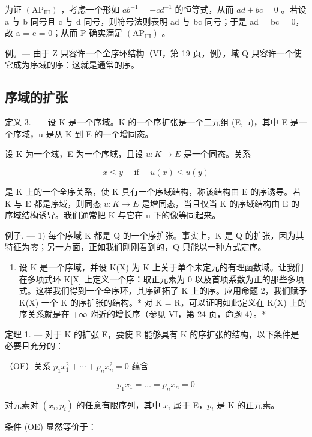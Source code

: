 为证 \((\mathrm{AP}_{\mathrm{III}})\) ，考虑一个形如 \(ab^{-1} = -cd^{-1}\) 的恒等式，从而 \(ad + bc = 0\) 。若设 a 与 b 同号且 c 与 d 同号，则符号法则表明 ad 与 bc 同号；于是 ad = bc = 0，故 a = c = 0；从而 P 确实满足 \((\mathrm{AP}_{\mathrm{III}})\) 。

例。--- 由于 Z 只容许一个全序环结构（VI，第 19 页，例），域 Q 只容许一个使它成为序域的序：这就是通常的序。

\subsection{序域的扩张}

定义 3.——设 K 是一个序域。K 的一个序扩张是一个二元组 (E, u)，其中 E 是一个序域，u 是从 K 到 E 的一个增同态。

设 K 为一个域，E 为一个序域，且设 \(u: K \rightarrow E\) 是一个同态。关系

\[
x \leqslant y \quad \text { if } \quad u (x) \leqslant u (y)
\]

是 K 上的一个全序关系，使 K 具有一个序域结构，称该结构由 E 的序诱导。若 K 与 E 都是序域，则同态 \(u: K \rightarrow E\) 是增同态，当且仅当 K 的序域结构由 E 的序域结构诱导。我们通常把 K 与它在 u 下的像等同起来。

例子. --- 1) 每个序域 K 都是 Q 的一个序扩张。事实上，K 是 Q 的扩张，因为其特征为零；另一方面，正如我们刚刚看到的，Q 只能以一种方式定序。

\begin{enumerate}
\def\labelenumi{\arabic{enumi})}
\setcounter{enumi}{1}
\tightlist
\item
  设 K 是一个序域，并设 K(X) 为 K 上关于单个未定元的有理函数域。让我们在多项式环 K{[}X{]} 上定义一个序：取正元素为 0 以及首项系数为正的那些多项式。这样我们得到一个全序环，其序延拓了 K 上的序。应用命题 2，我们赋予 K(X) 一个 K 的序扩张的结构。* 对 K = R，可以证明如此定义在 K(X) 上的序关系就是在 +∞ 附近的增长序（参见 VI，第 24 页，命题 4）。*
\end{enumerate}

定理 1. --- 对于 K 的扩张 E，要使 E 能够具有 K 的序扩张的结构，以下条件是必要且充分的：

（OE）关系 \(p_{1}x_{1}^{2} + \cdots + p_{n}x_{n}^{2} = 0\) 蕴含

\[
p _ {1} x _ {1} = \dots = p _ {n} x _ {n} = 0
\]

对元素对 \((x_{i},p_{i})\) 的任意有限序列，其中 \(x_{i}\) 属于 E，\(p_i\) 是 K 的正元素。

条件 (OE) 显然等价于：


